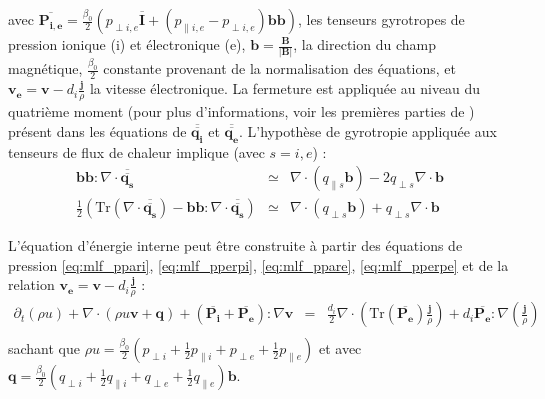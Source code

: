 avec $\overline{\boldsymbol{P_{i,e}}} =  \frac{\beta_0}{2} \left(p_{\perp i,e } \overline{\boldsymbol{I}} + \left(p_{\parallel i,e } - p_{\perp i,e }\right) \boldsymbol{b} \boldsymbol{b} \right) $, les tenseurs gyrotropes de pression ionique (i) et électronique (e), $\boldsymbol{b} = \frac{\boldsymbol{B}}{|\boldsymbol{B}|}$, la direction du champ magnétique, $\frac{\beta_0}{2} $ constante provenant de la normalisation des équations, et $\boldsymbol{v_e} = \boldsymbol{v} - d_i \frac{\boldsymbol{j}}{\rho} $ la vitesse électronique. La fermeture est appliquée au niveau du quatrième moment (pour plus d'informations, voir les premières parties de \cite{passot_collisionless_2007}) présent dans les équations de $ \overline{\overline{\boldsymbol{q_i}}}$ et $ \overline{\overline{\boldsymbol{q_e}}}$. L'hypothèse de gyrotropie appliquée aux tenseurs de flux de chaleur implique (avec $s = i,e$) :  
\begin{eqnarray*}
    \boldsymbol{b}\boldsymbol{b} : \nabla \cdot \overline{\overline{\boldsymbol{q_s}}} &\simeq& \nabla \cdot (q_{\parallel s} \boldsymbol{b}) - 2 q_{\perp s} \nabla \cdot \boldsymbol{b}\\
    \frac{1}{2} \left( \text{Tr}(\nabla \cdot \overline{\overline{\boldsymbol{q_s}}}) - \boldsymbol{b}\boldsymbol{b} : \nabla \cdot \overline{\overline{\boldsymbol{q_s}}} \right)  &\simeq&  \nabla \cdot (q_{\perp s} \boldsymbol{b})  + q_{\perp s} \nabla \cdot \boldsymbol{b}
\end{eqnarray*}


L'équation d'énergie interne peut être construite à partir des équations de pression \eqref{eq:mlf_ppari}, \eqref{eq:mlf_pperpi}, \eqref{eq:mlf_ppare}, \eqref{eq:mlf_pperpe} et de la relation $\boldsymbol{v_e} = \boldsymbol{v} - d_i \frac{\boldsymbol{j}}{\rho} $  : 
\begin{eqnarray}
\label{eq:mlf_ui} \partial_t \left(\rho u\right) + \nabla \cdot \left(\rho u \boldsymbol{v} + \boldsymbol{q}\right) +   \left(\overline{\boldsymbol{P_i}} + \overline{\boldsymbol{P_e}} \right): \nabla \boldsymbol{v} &=& \frac{d_i}{2}  \nabla \cdot  \left(\text{Tr} \left(\overline{\boldsymbol{P_e}}\right)  \frac{ \boldsymbol{j}}{\rho} \right) +  d_i \overline{\boldsymbol{P_{e}}} : \nabla \left(\frac{\boldsymbol{j}}{\rho} \right)\nonumber \\ 
\end{eqnarray}
sachant que $\rho u = \frac{\beta_0}{2} \left(p_{\perp i } + \frac{1}{2}p_{\parallel i} + p_{\perp e } + \frac{1}{2}p_{\parallel e} \right) $ et avec $\boldsymbol{q} = \frac{\beta_0}{2} \left(q_{\perp i } + \frac{1}{2}q_{\parallel i} + q_{\perp e } + \frac{1}{2}q_{\parallel e} \right)  \boldsymbol{b}$. 

